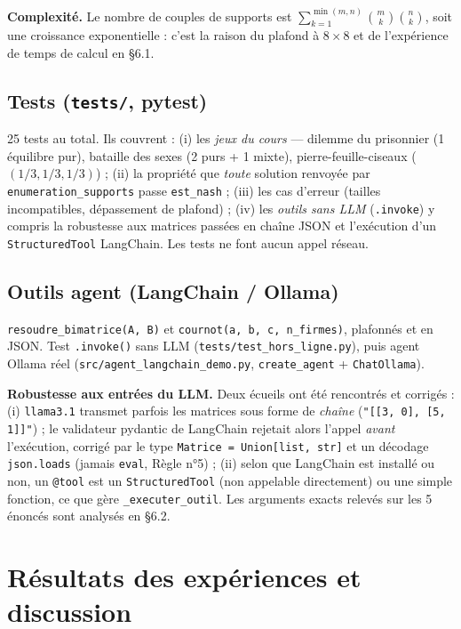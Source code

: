 \documentclass[11pt,a4paper]{article}
\begin{document}
\textbf{Complexité.} Le nombre de couples de supports est
$\sum_{k=1}^{\min(m,n)}\binom{m}{k}\binom{n}{k}$, soit une croissance exponentielle : c'est
la raison du plafond à $8\times8$ et de l'expérience de temps de calcul en §6.1.

\subsection{Tests (\texttt{tests/}, pytest)}
25 tests au total. Ils couvrent : (i) les \emph{jeux du cours} — dilemme du prisonnier
(1 équilibre pur), bataille des sexes (2 purs + 1 mixte), pierre-feuille-ciseaux
($(1/3,1/3,1/3)$) ; (ii) la propriété que \emph{toute} solution renvoyée par
\texttt{enumeration\_supports} passe \texttt{est\_nash} ; (iii) les cas d'erreur
(tailles incompatibles, dépassement de plafond) ; (iv) les \emph{outils sans LLM}
(\texttt{.invoke}) y compris la robustesse aux matrices passées en chaîne JSON et
l'exécution d'un \texttt{StructuredTool} LangChain. Les tests ne font aucun appel réseau.

\subsection{Outils agent (LangChain / Ollama)}
\texttt{resoudre\_bimatrice(A, B)} et \texttt{cournot(a, b, c, n\_firmes)}, plafonnés et en JSON.
Test \texttt{.invoke()} sans LLM (\texttt{tests/test\_hors\_ligne.py}), puis agent Ollama réel
(\texttt{src/agent\_langchain\_demo.py}, \texttt{create\_agent} + \texttt{ChatOllama}).

\textbf{Robustesse aux entrées du LLM.} Deux écueils ont été rencontrés et corrigés :
(i) \texttt{llama3.1} transmet parfois les matrices sous forme de \emph{chaîne}
(\texttt{"[[3, 0], [5, 1]]"}) ; le validateur pydantic de LangChain rejetait alors l'appel
\emph{avant} l'exécution, corrigé par le type \texttt{Matrice = Union[list, str]} et un
décodage \texttt{json.loads} (jamais \texttt{eval}, Règle n°5) ; (ii) selon que LangChain est
installé ou non, un \texttt{@tool} est un \texttt{StructuredTool} (non appelable
directement) ou une simple fonction, ce que gère \texttt{\_executer\_outil}. Les arguments
exacts relevés sur les 5 énoncés sont analysés en §6.2.

\section{Résultats des expériences et discussion}
\end{document}
